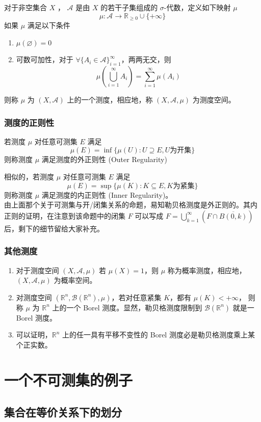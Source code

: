 \documentclass{ctexbook}
\newcommand{\R}{\mathbb{R}}
\newcommand{\ITEMS}{\begin{enumerate}[leftmargin=4em]}
\newcommand{\ITEME}{\end{enumerate}}
\begin{document}
对于非空集合 $X$ ， $\mathcal{A}$ 是由 $X$ 的若干子集组成的 $\sigma$-代数，定义如下映射 $\mu$
\[
	\mu:\mathcal{A} \to \R_{\ge 0} \cup \{+\infty \}
\]
如果 $\mu$ 满足以下条件
\ITEMS
	\item $\mu(\varnothing) = 0$
	\item 可数可加性，对于 $\forall\{A_i \in \mathcal{A}\}_{i=1}^\infty$，两两无交，则
	\[
		\mu\left( \bigcup_{i=1}^\infty A_i \right) = \sum_{i=1}^\infty\mu(A_i)
	\]
\ITEME 
则称 $\mu$ 为 $(X,\mathcal{A})$ 上的一个测度，相应地，称 $(X,\mathcal{A},\mu)$ 为测度空间。

\subsubsection{测度的正则性}

若测度 $\mu$ 对任意可测集 $E$ 满足
\[
	\mu(E) = \inf\{\mu(U):U\supseteq E,U\text{为开集}\}
\]
则称测度 $\mu$ 满足测度的外正则性 (Outer Regularity)

相似的，若测度 $\mu$ 对任意可测集 $E$ 满足
\[
	\mu(E) = \sup\{\mu(K):K\subseteq E,K\text{为紧集}\}
\]
则称测度 $\mu$ 满足测度的内正则性 (Inner Regularity)。 \\

由上面那个关于可测集与开/闭集关系的命题，易知勒贝格测度是外正则的。其内正则的证明，在注意到该命题中的闭集 $F$ 可以写成 $F = \bigcup_{k=1}^\infty \left(F\cap \overline {B(0,k)}\right)$ 后，剩下的细节留给大家补充。



\subsubsection{其他测度}

\ITEMS
	\item 对于测度空间 $(X,\mathcal{A},\mu)$ 若 $\mu(X) = 1$，则 $\mu$ 称为概率测度，相应地，$(X,\mathcal{A},\mu)$ 为概率空间。
	\item 对测度空间 $(\R^n,\mathcal B(\R^n),\mu)$，若对任意紧集 $K$，都有 $\mu(K) < +\infty$， 则称 $\mu$ 为 $\R^n$ 上的一个 Borel 测度。显然，勒贝格测度限制到 $\mathcal B(\R^n)$ 就是一 Borel 测度。
	\item 可以证明，$\R^n$ 上的任一具有平移不变性的 Borel 测度必是勒贝格测度乘上某个正实数。
\ITEME 

\section{一个不可测集的例子}

\subsection{集合在等价关系下的划分}
\end{document}
